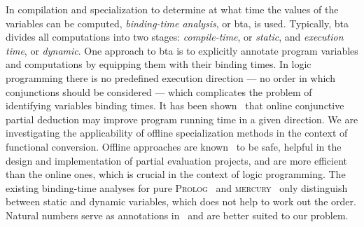 \documentclass[submission,copyright,creativecommons]{eptcs}
\newcommand{\prolog}{\textsc{Prolog}}
\newcommand{\mercury}{\textsc{mercury}}
\begin{document}
In compilation and specialization to determine at what time the values of the variables can be computed, \emph{binding-time analysis}, or bta, is used.
Typically, bta divides all computations into two stages: \emph{compile-time}, or \emph{static}, and \emph{execution time}, or \emph{dynamic}.
One approach to bta is to explicitly annotate program variables and computations by equipping them with their binding times.
In logic programming there is no predefined execution direction --- no order in which conjunctions should be considered ---
which complicates the problem of identifying variables binding times.
It has been shown~\cite{lozov2019relational} that online conjunctive partial deduction may improve program running time in a given direction.
We are investigating the applicability of offline specialization methods in the context of functional conversion.
Offline approaches are known~\cite{jones1993partial} to be safe, helpful in the design and implementation of partial evaluation projects, and are more efficient than the online ones, which is crucial in the context of logic programming.
The existing binding-time analyses for pure \prolog{}~\cite{craig2004fully} and \mercury{}~\cite{vanhoof2004binding} only distinguish between static and dynamic variables, which does not help to work out the order.
Natural numbers serve as annotations in~\cite{Thiemann1997AUF} and are better suited to our problem.


\end{document}
